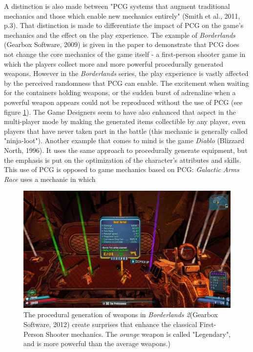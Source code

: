 A distinction is also made between "PCG systems that augment traditional mechanics and those which enable new mechanics entirely" (Smith et al., 2011, p.3)\cite{pdf:pcgbased}. That distinction is made to differentiate the impact of PCG on the game's mechanics and the effect on the play experience. The example of \textit{Borderlands} (Gearbox Software, 2009)\cite{game:border} is given in the paper to demonstrate that PCG does not change the core mechanics of the game itself - a first-person shooter game in which the players collect more and more powerful procedurally generated weapons. However in the \textit{Borderlands} series, the play experience is vastly affected by the perceived randomness that PCG can enable. The excitement when waiting for the containers holding weapons, or the sudden burst of adrenaline when a powerful weapon appears could not be reproduced without the use of PCG (see figure \ref{fig:Bl2}). The Game Designers seem to have also enhanced that aspect in the multi-player mode by making the generated items collectible by any player, even players that have never taken part in the battle (this mechanic is generally called "ninja-loot"). Another example that comes to mind is the game \textit{Diablo} (Blizzard North, 1996)\cite{game:diablo}. It uses the same approach to procedurally generate equipment, but the emphasis is put on the optimization of the character's attributes and skills. This use of PCG is opposed to game mechanics based on PCG: \textit{Galactic Arms Race} uses a mechanic in which 
\begin{figure}[h]
    \centering
    \includegraphics[scale=0.15]{Images/Borderlands2.jpg}
    \caption{The procedural generation of weapons in \textit{Borderlands 2}(Gearbox Software, 2012) create surprises that enhance the classical First-Person Shooter mechanics. The \textit{orange} weapon is called "Legendary", and is more powerful than the average weapons.)}
    \label{fig:Bl2}
\end{figure}

